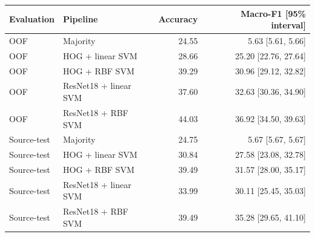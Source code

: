 \begin{tabular}{llrr}
\toprule
Evaluation & Pipeline & Accuracy & Macro-F1 [95\% interval] \\
\midrule
OOF & Majority & 24.55 & 5.63 [5.61, 5.66] \\
OOF & HOG + linear SVM & 28.66 & 25.20 [22.76, 27.64] \\
OOF & HOG + RBF SVM & 39.29 & 30.96 [29.12, 32.82] \\
OOF & ResNet18 + linear SVM & 37.60 & 32.63 [30.36, 34.90] \\
OOF & ResNet18 + RBF SVM & 44.03 & 36.92 [34.50, 39.63] \\
Source-test & Majority & 24.75 & 5.67 [5.67, 5.67] \\
Source-test & HOG + linear SVM & 30.84 & 27.58 [23.08, 32.78] \\
Source-test & HOG + RBF SVM & 39.49 & 31.57 [28.00, 35.17] \\
Source-test & ResNet18 + linear SVM & 33.99 & 30.11 [25.45, 35.03] \\
Source-test & ResNet18 + RBF SVM & 39.49 & 35.28 [29.65, 41.10] \\
\bottomrule
\end{tabular}
